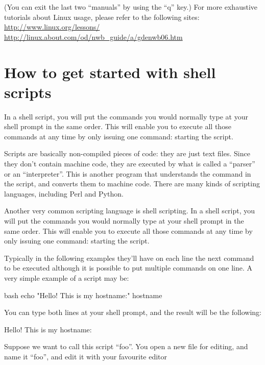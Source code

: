 \begin{prompt}
\end{prompt}

(You can exit the last two ``manuals'' by using the ``q'' key.)
For more exhaustive tutorials about Linux usage, please refer to the following sites:
\url{http://www.linux.org/lessons/}
\url{http://linux.about.com/od/nwb\_guide/a/gdenwb06.htm}

\section{How to get started with shell scripts}

In a shell script, you will put the commands you would normally type at your
shell prompt in the same order. This will enable you to execute all those
commands at any time by only issuing one command: starting the script.

Scripts are basically non-compiled pieces of code: they are just text files.
Since they don't contain machine code, they are executed by what is called a
``parser'' or an ``interpreter''. This is another program that understands the
command in the script, and converts them to machine code. There are many kinds
of scripting languages, including Perl and Python.

Another very common scripting language is shell scripting. In a shell script,
you will put the commands you would normally type at your shell prompt in the
same order. This will enable you to execute all those commands at any time by
only issuing one command: starting the script.

Typically in the following examples they'll have on each line the next command
to be executed although it is possible to put multiple commands on one line. A
very simple example of a script may be:

\begin{code}{bash}
echo "Hello! This is my hostname:"
hostname
\end{code}

You can type both lines at your shell prompt, and the result will be the following:

\begin{prompt}
Hello! This is my hostname:
\end{prompt}

Suppose we want to call this script ``foo''. You open a new file for editing, and
name it ``foo'', and edit it with your favourite editor

